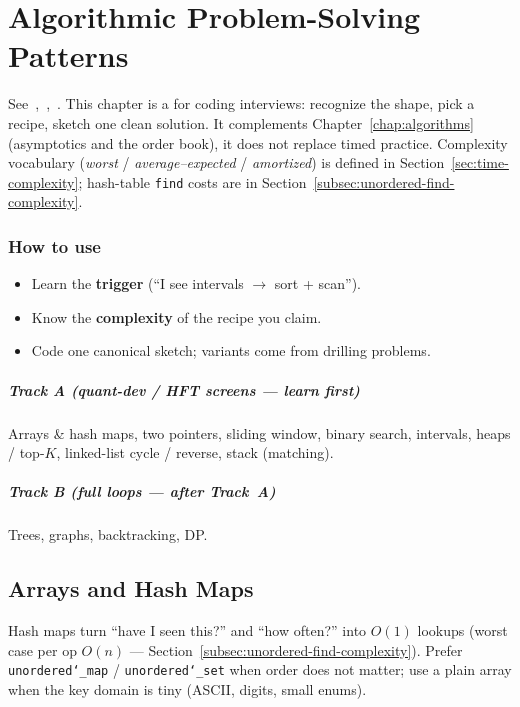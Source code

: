 \chapter{Algorithmic Problem-Solving Patterns}
\label{chap:algo-patterns}
See~\cite{algo-patterns-clrs},~\cite{algo-patterns-skiena},~\cite{neetcode-roadmap}.
\newline
This chapter is a  for coding interviews: recognize the shape,
pick a recipe, sketch one clean solution. It complements Chapter~\ref{chap:algorithms}
(asymptotics and the order book), it does not replace timed practice.
Complexity vocabulary (\emph{worst} / \emph{average--expected} / \emph{amortized})
is defined in Section~\ref{sec:time-complexity}; hash-table
\texttt{find} costs are in Section~\ref{subsec:unordered-find-complexity}.

\subsection*{How to use}
\begin{itemize}
    \item Learn the \textbf{trigger} (``I see intervals $\rightarrow$ sort + scan'').
    \item Know the \textbf{complexity} of the recipe you claim.
    \item Code one canonical sketch; variants come from drilling problems.
\end{itemize}

\paragraph*{Track A (quant-dev / HFT screens --- learn first)}
Arrays \& hash maps, two pointers, sliding window, binary search, intervals, heaps / top-$K$,
linked-list cycle / reverse, stack (matching).

\paragraph*{Track B (full loops --- after Track~A)}
Trees, graphs, backtracking, DP.

\section{Arrays and Hash Maps}
\label{sec:pat-arrays-hash}
Hash maps turn ``have I seen this?'' and ``how often?'' into 
$O(1)$ lookups (worst case per op $O(n)$ --- Section~\ref{subsec:unordered-find-complexity}).
Prefer \texttt{unordered\char`_map} / \texttt{unordered\char`_set} when order does not matter;
use a plain array when the key domain is tiny (ASCII, digits, small enums).

